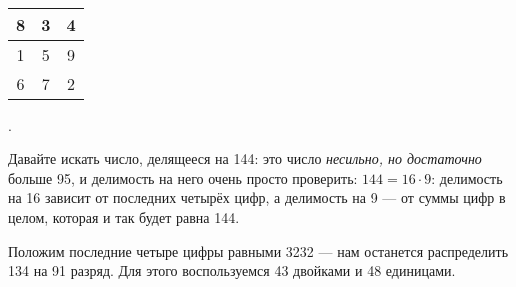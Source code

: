 \begin{itemize}
\itA \ 

\begin{center}
\begin{tabular}{|c|c|c|}
\hline
	8 & 3 & 4 \\
\hline
	1 & 5 & 9 \\
\hline
	6 & 7 & 2 \\
\hline
\end{tabular}
\end{center}

.

\itC Давайте искать число, делящееся на 144: это число {\itshape несильно, но достаточно} больше 95, и делимость на него очень просто проверить: $144 = 16\cdot 9$: делимость на 16 зависит от последних четырёх цифр, а делимость на 9 — от суммы цифр в целом, которая и так будет равна 144.

Положим последние четыре цифры равными 3232 — нам останется распределить 134 на 91 разряд. Для этого воспользуемся 43 двойками и 48 единицами.
\end{itemize}